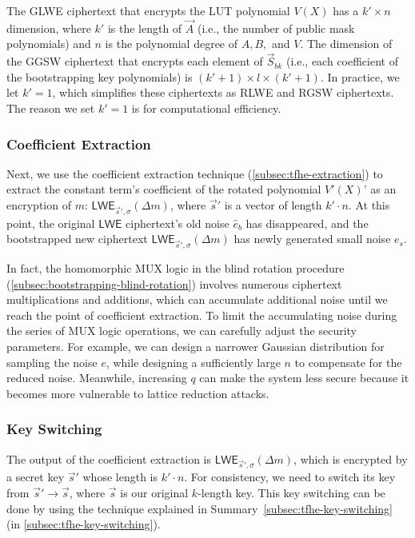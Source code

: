  The GLWE ciphertext that encrypts the LUT polynomial $V(X)$ has a $k' \times n$ dimension, where $k'$ is the length of $\vec{A}$ (i.e., the number of public mask polynomials) and $n$ is the polynomial degree of $A, B,$ and $V$. The dimension of the GGSW ciphertext that encrypts each element of $\vec{S}_{\textit{bk}}$ (i.e., each coefficient of the bootstrapping key polynomials) is $(k' + 1) \times l \times (k' + 1)$. In practice, we let $k' = 1$, which simplifies these ciphertexts as RLWE and RGSW ciphertexts. The reason we set $k' = 1$ is for computational efficiency. 

\subsubsection{Coefficient Extraction}

Next, we use the coefficient extraction technique (\autoref{subsec:tfhe-extraction}) to extract the constant term's coefficient of the rotated polynomial $V'(X)$' as an encryption of $m$: $\textsf{LWE}_{\vec{s}', \sigma}(\Delta m)$, where $\vec{s}'$ is a vector of length $k'\cdot n$. At this point, the original $\textsf{LWE}$ ciphertext's old noise $\hat{e}_b$ has disappeared, and the bootstrapped new ciphertext $\textsf{LWE}_{\vec{s}', \sigma}(\Delta m)$ has newly generated small noise $e_s$. 

In fact, the homomorphic MUX logic in the blind rotation procedure (\autoref{subsec:bootstrapping-blind-rotation}) involves numerous ciphertext multiplications and additions, which can accumulate additional noise until we reach the point of coefficient extraction. To limit the accumulating noise during the series of MUX logic operations, we can carefully adjust the security parameters. For example, we can design a narrower Gaussian distribution for sampling the noise $e$, while designing a sufficiently large $n$ to compensate for the reduced noise. Meanwhile, increasing $q$ can make the system less secure because it becomes more vulnerable to lattice reduction attacks. 


\subsubsection{Key Switching}
\label{subsec:bootstrapping-key-switch} 

The output of the coefficient extraction is $\textsf{LWE}_{\vec{s}', \sigma}(\Delta m)$, which is encrypted by a secret key $\vec{s}'$ whose length is $k'\cdot n$. For consistency, we need to switch its key from $\vec{s}' \rightarrow \vec{s}$, where $\vec{s}$ is our original $k$-length key. This key switching can be done by using the technique explained in Summary~\ref*{subsec:tfhe-key-switching} (in \autoref{subsec:tfhe-key-switching}).




